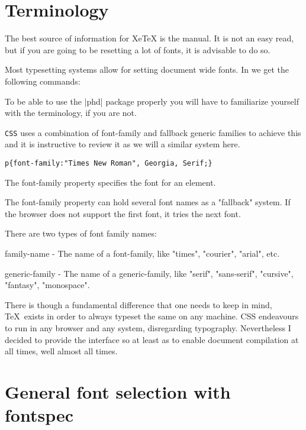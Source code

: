 \section{Terminology}

The best source of information for XeTeX is the  manual. It is not an easy read, but if you are going to be resetting a lot of fonts, it is advisable to do so.

Most typesetting systems allow for setting document wide fonts. In \latexe we get the following commands:





To be able to use the |phd| package properly you will have to familiarize yourself with the terminology, if you are not.

\texttt{CSS} uses a combination of font-family and fallback generic families to achieve this and it is instructive to review it as we will a similar system here.

\begin{tcolorbox}
\begin{lstlisting}
p{font-family:"Times New Roman", Georgia, Serif;}
\end{lstlisting}
\end{tcolorbox}

The font-family property specifies the font for an element.

The font-family property can hold several font names as a "fallback" system. If the browser does not support the first font, it tries the next font.

There are two types of font family names:

family-name - The name of a font-family, like "times", "courier", "arial", etc.

generic-family - The name of a generic-family, like "serif", "sans-serif", "cursive", "fantasy", "monospace".

There is though a fundamental difference that one needs to keep in mind, \TeX\ exists in order to always typeset the same on any machine. CSS endeavours to run in any browser and any system, disregarding typography. Nevertheless I decided to provide the interface so at least as to enable document compilation at all times, well almost all times.


\section{General font selection with fontspec}

